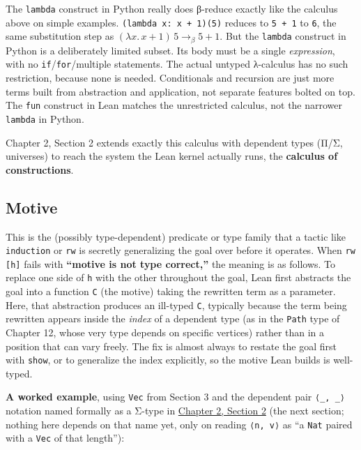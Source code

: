\begin{progcorner}

The \texttt{lambda} construct in Python really does β-reduce exactly like the calculus above on simple examples. \texttt{(lambda x: x + 1)(5)} reduces to \texttt{5 + 1} to \texttt{6}, the same substitution step as \((\lambda x.\, x + 1)\, 5 \to_\beta 5 + 1\). But the \texttt{lambda} construct in Python is a deliberately limited subset. Its body must be a single \emph{expression}, with no \texttt{if}/\texttt{for}/multiple statements. The actual untyped λ-calculus has no such restriction, because none is needed. Conditionals and recursion are just more terms built from abstraction and application, not separate features bolted on top. The \texttt{fun} construct in Lean matches the unrestricted calculus, not the narrower \texttt{lambda} in Python.

\end{progcorner}

Chapter 2, Section 2 extends exactly this calculus with dependent types (Π/Σ, universes) to reach the system the Lean kernel actually runs, the \textbf{calculus of constructions}.

\subsection{Motive}\label{sec:02-terminology-and-coc:01-terminology:5}

This is the (possibly type-dependent) predicate or type family that a tactic like \texttt{induction} or \texttt{rw} is secretly generalizing the goal over before it operates. When \texttt{rw [h]} fails with \textbf{``motive is not type correct,''} the meaning is as follows. To replace one side of \texttt{h} with the other throughout the goal, Lean first abstracts the goal into a function \texttt{C} (the motive) taking the rewritten term as a parameter. Here, that abstraction produces an ill-typed \texttt{C}, typically because the term being rewritten appears inside the \emph{index} of a dependent type (as in the \texttt{Path} type of Chapter 12, whose very type depends on specific vertices) rather than in a position that can vary freely. The fix is almost always to restate the goal first with \texttt{show}, or to generalize the index explicitly, so the motive Lean builds is well-typed.

\textbf{A worked example}, using \texttt{Vec} from Section 3 and the dependent pair \texttt{⟨\_\allowbreak{}, \_\allowbreak{}⟩} notation named formally as a Σ-type in \hyperref[sec:02-terminology-and-coc:02-pi-sigma-and-coc:1]{Chapter 2, Section 2} (the next section; nothing here depends on that name yet, only on reading \texttt{⟨n, v⟩} as ``a \texttt{Nat} paired with a \texttt{Vec} of that length''):

